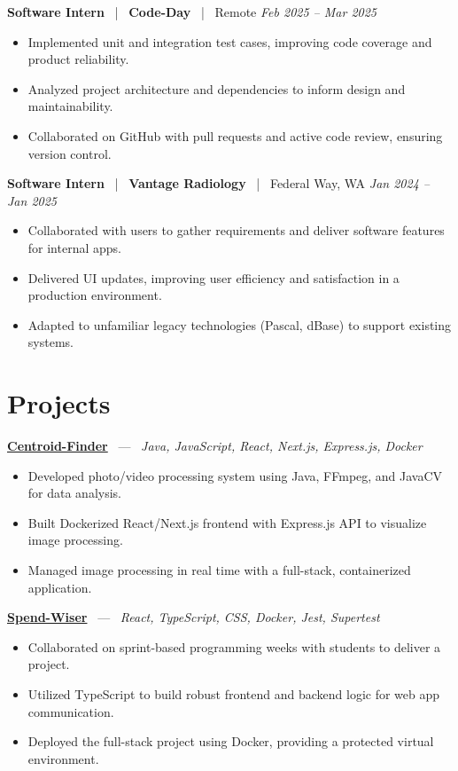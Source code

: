 \documentclass[10pt, letterpaper]{article}
\newcommand{\jobhead}[4]{%
  \vspace{5pt}%
  {\bfseries\color{dark}#1}%
  ~{\color{light}|}~%
  {\bfseries\color{navy}#2}%
  ~{\color{light}|}~%
  {\color{light}#3}%
  \hfill{\color{light}\small\textit{#4}}\\[-2pt]%
}
\newcommand{\projhead}[3]{%
  \vspace{5pt}%
  {\bfseries\color{dark}\href{#2}{#1}}%
  ~{\color{light}---}~%
  {\color{light}\small\textit{#3}}\\[-2pt]%
}
\begin{document}
\jobhead{Software Intern}{Code-Day}{Remote}{Feb 2025 – Mar 2025}
\begin{itemize}
  \item Implemented unit and integration test cases, improving code coverage and product reliability.
  \item Analyzed project architecture and dependencies to inform design and maintainability.
  \item Collaborated on GitHub with pull requests and active code review, ensuring version control.
\end{itemize}

\jobhead{Software Intern}{Vantage Radiology}{Federal Way, WA}{Jan 2024 – Jan 2025}
\begin{itemize}
  \item Collaborated with users to gather requirements and deliver software features for internal apps.
  \item Delivered UI updates, improving user efficiency and satisfaction in a production environment.
  \item Adapted to unfamiliar legacy technologies (Pascal, dBase) to support existing systems.
\end{itemize}

\section{Projects}

\projhead{Centroid-Finder}{https://github.com/xavierb117/centroid-finder}{Java, JavaScript, React, Next.js, Express.js, Docker}
\begin{itemize}
  \item Developed photo/video processing system using Java, FFmpeg, and JavaCV for data analysis.
  \item Built Dockerized React/Next.js frontend with Express.js API to visualize image processing.
  \item Managed image processing in real time with a full-stack, containerized application.
\end{itemize}

\projhead{Spend-Wiser}{https://github.com/JesseChum/w26-sdev372-spendwiser-finance-tracker}{React, TypeScript, CSS, Docker, Jest, Supertest}
\begin{itemize}
  \item Collaborated on sprint-based programming weeks with students to deliver a project.
  \item Utilized TypeScript to build robust frontend and backend logic for web app communication.
  \item Deployed the full-stack project using Docker, providing a protected virtual environment.
\end{itemize}
\end{document}
